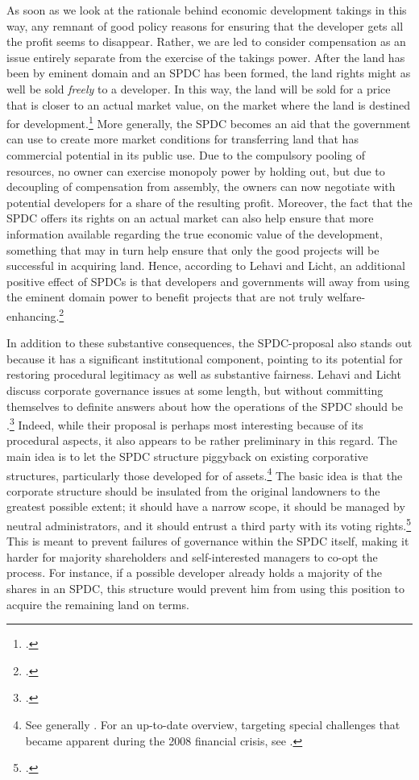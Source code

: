 {As soon as we look at the rationale behind economic development takings in this way, any remnant of good policy reasons for ensuring that the developer gets all the profit seems to disappear. Rather, we are led to consider compensation as an issue entirely separate from the exercise of the takings power. After the land has been  by eminent domain and an SPDC has been formed, the land rights might as well be sold {\it freely} to a developer. In this way, the land will be sold for a price that is closer to an actual market value, on the market where the land is destined for development.\footcite[1735-1736]{lehavi07} More generally, the SPDC becomes an aid that the government can use to create more  market conditions for transferring land that has commercial potential in its public use. Due to the compulsory pooling of resources, no owner can exercise monopoly power by holding out, but due to decoupling of compensation from assembly, the owners can now negotiate with potential developers for a share of the resulting profit. Moreover, the fact that the SPDC offers its rights on an actual market can also help ensure that more information  available regarding the true economic value of the development, something that may in turn help ensure that only the good projects will be successful in acquiring land. Hence, according to Lehavi and Licht, an additional positive effect of SPDCs is that developers and governments will away from using the eminent domain power to benefit projects that are not truly welfare-enhancing.\footcite[1735-1736]{lehavi07}

In addition to these substantive consequences, the SPDC-proposal also stands out because it has a significant institutional component, pointing to its potential for restoring procedural legitimacy as well as substantive fairness. Lehavi and Licht discuss corporate governance issues at some length, but without committing themselves to definite answers about how the operations of the SPDC should be .\footcite[1040-1048]{lehavi07} Indeed, while their proposal is perhaps most interesting because of its procedural aspects, it also appears to be rather preliminary in this regard. The main idea is to let the SPDC structure piggyback on existing corporative structures, particularly those developed for  of assets.\footnote{See generally \cite{schwarcz94}. For an up-to-date overview, targeting special challenges that became apparent during the 2008 financial crisis, see \cite{schwarcz13}.} The basic idea is that the corporate structure should be insulated from the original landowners to the greatest possible extent; it should have a narrow scope, it should be managed by neutral administrators, and it should entrust a third party with its voting rights.\footcite[1742]{lehavi07} This is meant to prevent failures of governance within the SPDC itself, making it harder for majority shareholders and self-interested managers to co-opt the process. For instance, if a possible developer already holds a majority of the shares in an SPDC, this structure would prevent him from using this position to acquire the remaining land on  terms. 

}
